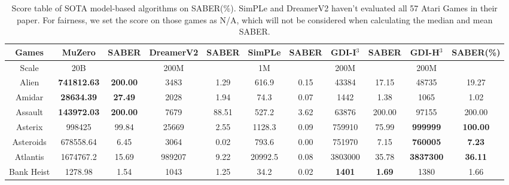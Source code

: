 \documentclass[nohyperref]{article}
\newcommand{\best}[1]{\textbf{#1}}
\theoremstyle{plain}
\begin{document}
\begin{table}[!hb]
\footnotesize
\begin{center}
\caption{Score table of  SOTA  model-based algorithms on SABER(\%). SimPLe \citep{modelbasedatari} and DreamerV2 \citep{dreamerv2} haven't evaluated all 57 Atari Games in their paper. For fairness, we set the score on those games as N/A, which will not be considered when calculating the median and mean SABER.}
\label{Tab: Score table of  SOTA  model-based algorithms on SABER.}
\setlength{\tabcolsep}{1.0pt}
\begin{tabular}{|c |c c| c c| c c| c c| c c| }
\hline
 Games              & MuZero         & SABER      & DreamerV2 & SABER   & SimPLe             & SABER          & GDI-I$^3$     & SABER & GDI-H$^3$ & SABER(\%)\\
\hline
Scale               & 20B            &              & 200M      &            & 1M               &                  & 200M     & &  200M   & \\
\hline
 Alien              & \textbf{741812.63}      & \textbf{200.00  }     &3483       & 1.29     &616.9     & 0.15    & 43384                       &  17.15      &48735    &19.27   \\
 Amidar             & \textbf{28634.39 }      & \textbf{27.49   }  &2028       & 1.94     &74.3      & 0.07    & 1442                           &  1.38       &1065     &1.02          \\
 Assault            & \textbf{143972.03}      & \textbf{200.00 }     &7679       & 88.51       &527.2     & 3.62       & 63876                  &  200.00     &97155     &200.00    \\
 Asterix            & 998425         & 99.84        &25669      & 2.55     &1128.3    & 0.09       & 759910                     &  75.99      &\textbf{999999}            &\textbf{100.00}    \\
 Asteroids          & 678558.64               & 6.45        &3064                & 0.02    &793.6              & 0.00           &751970         & 7.15   &\textbf{760005}            &\textbf{7.23}   \\
 Atlantis           & 1674767.2               & 15.69           &989207              & 9.22       &20992.5            & 0.08    &3803000    & 35.78  &\textbf{3837300}           &\textbf{36.11} \\
 Bank Heist         & 1278.98                 & 1.54        &1043                & 1.25    &34.2               & 0.02    &\best{1401}           & \best{1.69  } &1380              &1.66   \\

\end{tabular}
\end{center}
\end{table}
\end{document}
